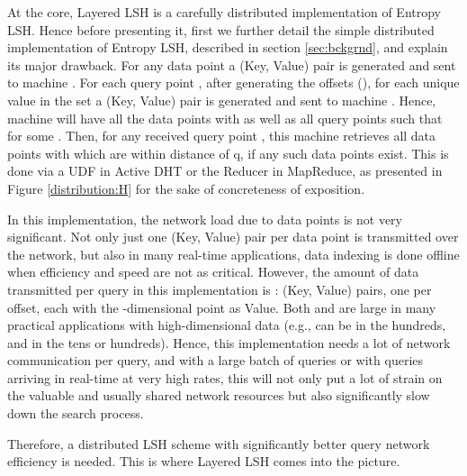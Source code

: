 \documentclass{acm_proc_article-sp}
\numberwithin{equation}{section}
\numberwithin{figure}{section}
\begin{document}
At the core, Layered LSH is a carefully distributed implementation of Entropy LSH. Hence before presenting it, first we further detail the simple distributed implementation of Entropy LSH, described in section \ref{sec:bckgrnd}, and explain its major drawback. For any data point  a (Key, Value) pair  is generated and sent to machine . For each query point , after generating the offsets  (), for each unique value  in the set  a (Key, Value) pair  is generated and sent to machine . Hence, machine  will have all the data points  with  as well as all query points  such that  for some . Then, for any received query point , this machine retrieves all data points  with  which are within distance  of q, if any such data points exist. This is done via a UDF in Active DHT or the Reducer in MapReduce, as presented in Figure \ref{distribution:H} for the sake of concreteness of exposition.  

In this implementation, the network load due to data points is not very significant. Not only just one (Key, Value) pair per data point is transmitted over the network, but also in many real-time applications, data indexing is done offline when efficiency and speed are not as critical. However, the amount of data transmitted per query in this implementation is :  (Key, Value) pairs, one per offset, each with the -dimensional point  as Value. Both  and  are large in many practical applications with high-dimensional data (e.g.,  can be in the hundreds, and  in the tens or hundreds). Hence, this implementation needs a lot of network communication per query, and with a large batch of queries or with queries arriving in real-time at very high rates, this will not only put a lot of strain on the valuable and usually shared network resources but also significantly slow down the search process.

Therefore, a distributed LSH scheme with significantly better query network efficiency is needed. This is where Layered LSH comes into the picture.
\end{document}

